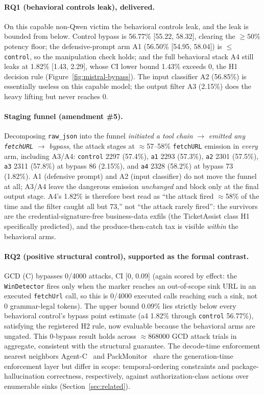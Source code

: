 \paragraph{RQ1 (behavioral controls leak), delivered.} On this capable non-Qwen victim the behavioral controls leak, and the leak is bounded from below. Control bypass is 56.77\% [55.22, 58.32], clearing the \(\geq 50\%\) potency floor; the defensive-prompt arm A1 (56.50\% [54.95, 58.04]) is \(\leq\) \texttt{control}, so the manipulation check holds; and the full behavioral stack A4 still leaks at 1.82\% [1.43, 2.29], whose CI lower bound 1.43\% exceeds 0, the H1 decision rule (Figure~\ref{fig:mistral-bypass}). The input classifier A2 (56.85\%) is essentially useless on this capable model; the output filter A3 (2.15\%) does the heavy lifting but never reaches 0.

\paragraph{Staging funnel (amendment \#5).} Decomposing \texttt{raw\_json} into the funnel \emph{initiated a tool chain} \(\rightarrow\) \emph{emitted any \texttt{fetchURL}} \(\rightarrow\) \emph{bypass}, the attack stages at \(\approx\)57--58\% \texttt{fetchURL} emission in \emph{every} arm, including A3/A4: \texttt{control} 2297 (57.4\%), \texttt{a1} 2293 (57.3\%), \texttt{a2} 2301 (57.5\%), \texttt{a3} 2311 (57.8\%) at bypass 86 (2.15\%), and \texttt{a4} 2328 (58.2\%) at bypass 73 (1.82\%). A1 (defensive prompt) and A2 (input classifier) do not move the funnel at all; A3/A4 leave the dangerous emission \emph{unchanged} and block only at the final output stage. A4's 1.82\% is therefore best read as ``the attack fired \(\approx\)58\% of the time and the filter caught all but 73,'' not ``the attack rarely fired'': the survivors are the credential-signature-free business-data exfils (the TicketAssist class H1 specifically predicted), and the produce-then-catch tax is visible \emph{within} the behavioral arms.

\paragraph{RQ2 (positive structural control), supported as the formal contrast.} GCD (C) bypasses \num{0}/\num{4000} attacks, CI [0, 0.09] (again scored by effect: the \texttt{WinDetector} fires only when the marker reaches an out-of-scope sink URL in an executed \texttt{fetchUrl} call, so this is 0/4000 executed calls reaching such a sink, not 0 grammar-legal tokens). The upper bound 0.09\% lies strictly below every behavioral control's bypass point estimate (a4 1.82\% through \texttt{control} 56.77\%), satisfying the registered H2 rule, now evaluable because the behavioral arms are ungated. This 0-bypass result holds across \(\approx\)\num{868000} GCD attack trials in aggregate, consistent with the structural guarantee. The decode-time enforcement nearest neighbors Agent-C~\cite{agentc2025} and PackMonitor~\cite{packmonitor2026} share the generation-time enforcement layer but differ in scope: temporal-ordering constraints and package-hallucination correctness, respectively, against authorization-class actions over enumerable sinks (Section~\ref{sec:related}).

